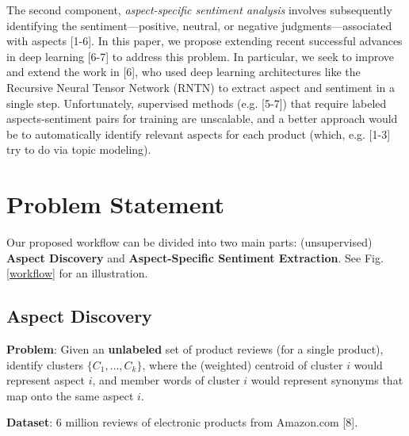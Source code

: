\documentclass{article} %
\begin{document}
The second component, \textit{aspect-specific sentiment analysis} involves subsequently identifying the sentiment---positive, neutral, or negative judgments---associated with aspects [1-6]. In this paper, we propose extending recent successful advances in deep learning [6-7] to address this problem. In particular, we seek to improve and extend the work in [6], who used deep learning architectures like the Recursive Neural Tensor Network (RNTN) to extract aspect and sentiment in a single step. Unfortunately, supervised methods (e.g. [5-7]) that require labeled aspects-sentiment pairs for training are unscalable, and a better approach would be to automatically identify relevant aspects for each product (which, e.g. [1-3] try to do via topic modeling). 











\section{Problem Statement}

Our proposed workflow can be divided into two main parts: (unsupervised) {\bf Aspect Discovery} and {\bf Aspect-Specific Sentiment Extraction}. See Fig. \ref{workflow} for an illustration.

\subsection{Aspect Discovery}

\textbf{Problem}: Given an {\bf unlabeled} set of product reviews (for a single product), identify clusters $\{C_1,\ldots, C_k\}$, where the (weighted) centroid of cluster $i$ would represent aspect $i$, and member words of cluster $i$ would represent synonyms that map onto the same aspect $i$.

\textbf{Dataset}: 6 million reviews of electronic products from Amazon.com [8].
\end{document}
